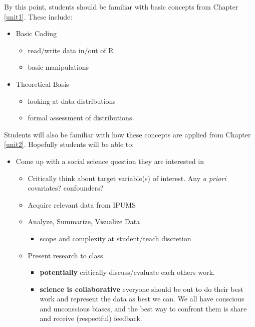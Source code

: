 \documentclass[
]{book}
\providecommand{\tightlist}{%
  \setlength{\itemsep}{0pt}\setlength{\parskip}{0pt}}
\begin{document}
By this point, students should be familiar with basic concepts from Chapter \ref{unit1}. These include:

\begin{itemize}
\tightlist
\item
  Basic Coding

  \begin{itemize}
  \tightlist
  \item
    read/write data in/out of R
  \item
    basic manipulations
  \end{itemize}
\item
  Theoretical Basis

  \begin{itemize}
  \tightlist
  \item
    looking at data distributions
  \item
    formal assessment of distributions
  \end{itemize}
\end{itemize}

Students will also be familiar with how these concepts are applied from Chapter \ref{unit2}. Hopefully students will be able to:

\begin{itemize}
\tightlist
\item
  Come up with a social science question they are interested in

  \begin{itemize}
  \tightlist
  \item
    Critically think about target variable(s) of interest. Any \emph{a priori} covariates? confounders?
  \item
    Acquire relevant data from IPUMS
  \item
    Analyze, Summarize, Visualize Data

    \begin{itemize}
    \tightlist
    \item
      scope and complexity at student/teach discretion
    \end{itemize}
  \item
    Present research to class

    \begin{itemize}
    \tightlist
    \item
      \textbf{potentially} critically discuss/evaluate each others work.
    \item
      \textbf{science is collaborative} everyone should be out to do their best work and represent the data as best we can. We all have conscious and unconscious biases, and the best way to confront them is share and receive (respectful) feedback.
    \end{itemize}
  \end{itemize}
\end{itemize}
\end{document}
